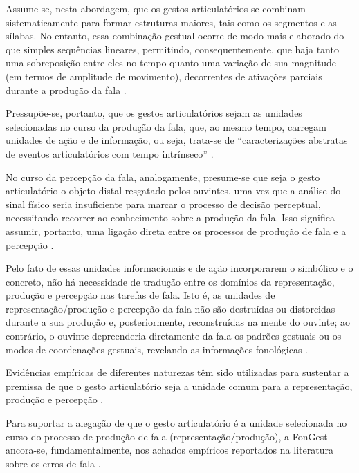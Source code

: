 \documentclass[output=paper,colorlinks,citecolor=brown,booklanguage=portuguese]{langscibook}
\begin{document}
Assume-se, nesta abordagem, que os gestos articulatórios se combinam sistematicamente para formar estruturas maiores, tais como os segmentos e as sílabas. No entanto, essa combinação gestual ocorre de  modo mais elaborado do que simples sequências lineares, permitindo, consequentemente, que haja tanto uma sobreposição entre eles no tempo quanto uma variação de sua magnitude (em termos de amplitude de movimento), decorrentes de ativações parciais durante a produção da fala \citep{Goldstein2003a, Goldstein2006}.

Pressupõe-se, portanto, que os gestos articulatórios sejam as unidades selecionadas no curso da produção da fala, que, ao mesmo tempo, carregam unidades de ação e de informação, ou seja, trata-se de “caracterizações abstratas de eventos articulatórios com tempo intrínseco” \citep[155-156]{Browman1992}.

No curso da percepção da fala, analogamente, presume-se que seja o gesto articulatório o objeto distal resgatado pelos ouvintes, uma vez que a análise do sinal físico seria insuficiente para marcar o processo de decisão perceptual, necessitando recorrer ao conhecimento sobre a produção da fala. Isso significa assumir, portanto, uma ligação direta entre os processos de produção de fala e a percepção \citep{Fowler1996, Goldstein2003a}.

Pelo fato de essas unidades informacionais e de ação incorporarem o simbólico e o concreto, não há necessidade de tradução entre os domínios da representação, produção e percepção nas tarefas de fala. Isto é, as unidades de representação/produção e percepção da fala não são destruídas ou distorcidas durante a sua produção e, posteriormente, reconstruídas na mente do ouvinte; ao contrário, o ouvinte depreenderia diretamente da fala os padrões gestuais ou os modos de coordenações gestuais, revelando as informações fonológicas \citep{Goldstein2003a}.

Evidências empíricas de diferentes naturezas têm sido utilizadas para sustentar a premissa de que o gesto articulatório seja a unidade comum para a representação, produção e percepção \citep{Rizzolatti1998, StudderKennedy2003, Rizzolatti2004, Pouplier2005, Galantucci2006, Gentilucci2006, Goldstein2007, Pouplier2008, McMillan2010, Ardestani2013}. 

Para suportar a alegação de que o gesto articulatório é a unidade selecionada no curso do processo de produção de fala (representação/produção), a FonGest ancora-se, fundamentalmente, nos achados empíricos reportados na literatura sobre os erros de fala \citep{Pouplier2005, Goldstein2007, Pouplier2008, McMillan2010, Ardestani2013}.
\end{document}
